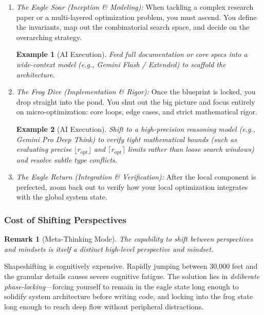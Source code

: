 \documentclass{article}
\newtheorem{example}{Example}
\newtheorem{remark}{Remark}
\begin{document}
\begin{enumerate}[label=\emph{\arabic*.}]
	\item \emph{The Eagle Soar (Inception \& Modeling):} When tackling a complex research paper or a multi-layered optimization problem, you must ascend. You define the invariants, map out the combinatorial search space, and decide on the overarching strategy.
	
	\begin{example}[AI Execution]
		Feed full documentation or core specs into a wide-context model (e.g., Gemini Flash / Extended) to scaffold the architecture.
	\end{example}
	
	\item \emph{The Frog Dive (Implementation \& Rigor):} Once the blueprint is locked, you drop straight into the pond. You shut out the big picture and focus entirely on micro-optimization: core loops, edge cases, and strict mathematical rigor.
	
	\begin{example}[AI Execution]
		Shift to a high-precision reasoning model (e.g., Gemini Pro Deep Think) to verify tight mathematical bounds (such as evaluating precise $\lfloor r_{\text{opt}} \rfloor$ and $\lceil r_{\text{opt}} \rceil$ limits rather than loose search windows) and resolve subtle type conflicts.
	\end{example}
	
	\item \emph{The Eagle Return (Integration \& Verification):} After the local component is perfected, zoom back out to verify how your local optimization integrates with the global system state.
\end{enumerate}

\subsubsection{Cost of Shifting Perspectives}

\begin{remark}[Meta-Thinking Mode]
	The capability to shift between perspectives and mindsets is itself a distinct high-level perspective and mindset.
\end{remark}

Shapeshifting is cognitively expensive. Rapidly jumping between 30,000 feet and the granular details causes severe cognitive fatigue. The solution lies in \textit{deliberate phase-locking}---forcing yourself to remain in the eagle state long enough to solidify system architecture before writing code, and locking into the frog state long enough to reach deep flow without peripheral distractions.
\end{document}
